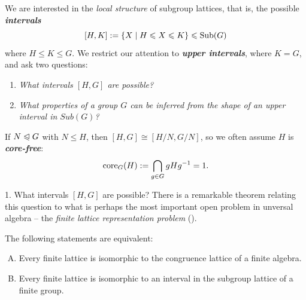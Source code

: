 \documentclass[xcolor=dvipsnames,11pt,hide notes]{beamer}
\newcommand{\defn}[1]{\textcolor{olivegreen}{\textit{\textbf{#1}}}}
\theoremstyle{definition}
\theoremstyle{remark}
\numberwithin{theorem}{section}
\numberwithin{claim}{section}
\numberwithin{equation}{section}
\numberwithin{conjecture}{section}
\begin{document}
\begin{frame}[fragile,label=LocalStructure]{}
We are interested in the \emph{local structure} of subgroup lattices, that is,
the possible \defn{intervals}
\[
[H, K] := \{X \mid H \leqslant X \leqslant K\} \leqslant \mathrm{Sub}(G)
\]
where $H \leq K \leq G$. 
\vskip4mm
We restrict our attention to \defn{upper intervals}, where $K = G$, and ask two
questions:
\vskip4mm
\begin{enumerate}
\item \emph{What intervals $[H,G]$ are possible?}
\vskip4mm
\item \emph{What properties of a group $G$ can be inferred from the shape of an
  upper interval in $Sub(G)$?}
\end{enumerate}
\end{frame}

\begin{frame}[fragile,label=LocalStructureCoreFree]{}
If $N \trianglelefteqslant G$
with $N \leq H$, then  $[H, G]\cong [H/N, G/N]$, 
\vskip2mm
so we often assume $H$ is \defn{core-free}:
\[
\mathrm{core}_G(H) := \bigcap_{g\in G} gHg^{-1} = 1.
\]
\end{frame}

\begin{frame}[fragile,label=LocalStructureNote]{}
\end{frame}

\begin{frame}[fragile,label=LocalStructure]{1. What intervals $[H,G]$ are possible?}
There is a remarkable theorem relating this question to what is perhaps the
most important open problem in unversal algebra -- 
the \emph{finite lattice representation problem} (\FLRP).
\vskip5mm
\begin{theorem}
\label{thm:P5}
The following statements are equivalent:
\begin{enumerate}[(A)]
\item Every finite lattice is isomorphic to
  the congruence lattice of a finite algebra.
\item Every finite lattice is isomorphic to
  an interval in the subgroup lattice of a finite group.
\end{enumerate}
\end{theorem}
\end{frame}
\end{document}
